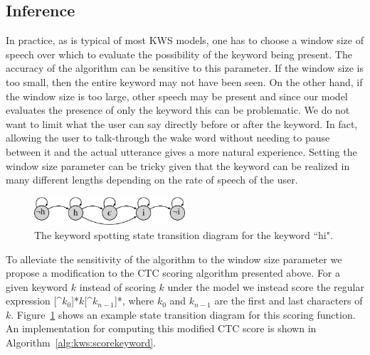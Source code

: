 \subsection{Inference}

In practice, as is typical of most KWS models, one has to choose a window size
of speech over which to evaluate the possibility of the keyword being present.
The accuracy of the algorithm can be sensitive to this parameter. If the window
size is too small, then the entire keyword may not have been seen. On the other
hand, if the window size is too large, other speech may be present and since
our model evaluates the presence of only the keyword this can be problematic.
We do not want to limit what the user can say directly before or after the
keyword. In fact, allowing the user to talk-through the wake word without
needing to pause between it and the actual utterance gives a more natural
experience. Setting the window size parameter can be tricky given that the
keyword can be realized in many different lengths depending on the rate of
speech of the user.

\begin{figure}[ht!]
    \centering
    \includegraphics[width=0.5\textwidth]{kws/figures/kws_hmm.pdf}
    \caption{The keyword spotting state transition diagram for the keyword
             ``hi".}
    \label{fig:kws:hmm}
\end{figure}

To alleviate the sensitivity of the algorithm to the window size parameter we
propose a modification to the CTC scoring algorithm presented above. For a
given keyword $k$ instead of scoring $k$ under the model we instead score the
regular expression [\^{}$k_0$]*$k$[\^{}$k_{n-1}$]*, where $k_0$ and $k_{n-1}$
are the first and last characters of $k$. Figure~\ref{fig:kws:hmm} shows an
example state transition diagram for this scoring function. An implementation
for computing this modified CTC score is shown in
Algorithm~\ref{alg:kws:scorekeyword}.

